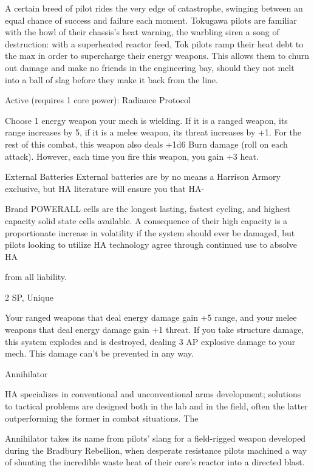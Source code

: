  A certain breed of pilot rides the very edge of catastrophe, swinging between an equal chance of
  success and failure each moment. Tokugawa pilots are familiar with the howl of their chassis’s heat
  warning, the warbling siren a song of destruction: with a superheated reactor feed, Tok pilots ramp their
  heat debt to the max in order to supercharge their energy weapons. This allows them to churn out
  damage and make no friends in the engineering bay, should they not melt into a ball of slag before they
  make it back from the line.

  Active (requires 1 core power):
  Radiance
  Protocol

  Choose 1 energy weapon your mech is wielding. If it is a ranged weapon, its range increases by 5, if it
  is a melee weapon, its threat increases by +1. For the rest of this combat, this weapon also deals +1d6
  Burn damage (roll on each attack). However, each time you fire this weapon, you gain +3 heat.

External Batteries
External batteries are by no means a Harrison Armory exclusive, but HA literature will ensure you that HA-

Brand POWERALL cells are the longest lasting, fastest cycling, and highest capacity solid state cells
available. A consequence of their high capacity is a proportionate increase in volatility if the system should
ever be damaged, but pilots looking to utilize HA technology agree through continued use to absolve HA

from all liability.

2 SP, Unique





Your ranged weapons that deal energy damage gain +5 range, and your melee weapons that
deal energy damage gain +1 threat. If you take structure damage, this system explodes and is
destroyed, dealing 3 AP explosive damage to your mech. This damage can’t be prevented in any
way.


Annihilator

HA specializes in conventional and unconventional arms development; solutions to tactical problems are
designed both in the lab and in the field, often the latter outperforming the former in combat situations. The

Annihilator takes its name from pilots’ slang for a field-rigged weapon developed during the Bradbury
Rebellion, when desperate resistance pilots machined a way of shunting the incredible waste heat of their
core’s reactor into a directed blast.

